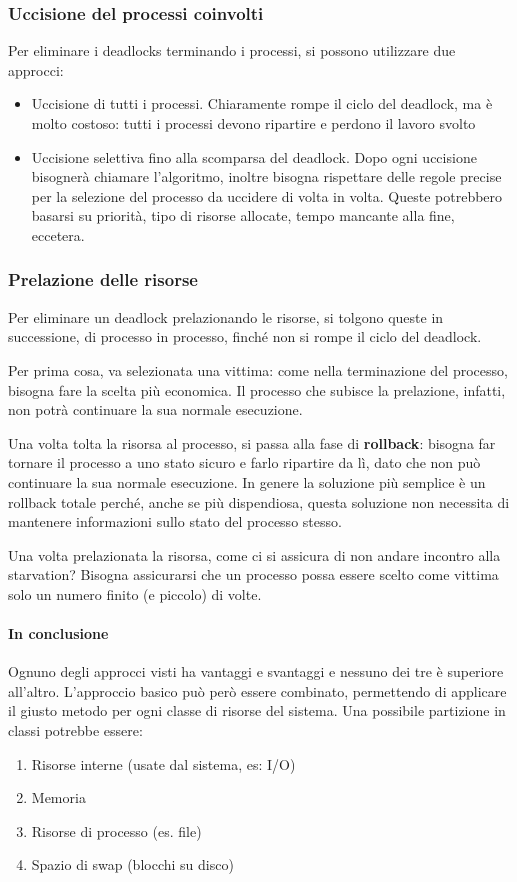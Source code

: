 \documentclass[a4]{article}
\begin{document}
\subsubsection{Uccisione del processi coinvolti}
Per eliminare i deadlocks terminando i processi, si possono utilizzare due approcci:
\begin{itemize}
    \item Uccisione di tutti i processi. Chiaramente rompe il ciclo del deadlock, ma è molto costoso: tutti i processi devono ripartire e perdono il lavoro svolto
    \item Uccisione selettiva fino alla scomparsa del deadlock. Dopo ogni uccisione bisognerà chiamare l'algoritmo, inoltre bisogna rispettare delle regole precise per la selezione del processo da uccidere di volta in volta. Queste potrebbero basarsi su priorità, tipo di risorse allocate, tempo mancante  alla fine, eccetera.
\end{itemize}

\subsubsection{Prelazione delle risorse}
Per eliminare un deadlock prelazionando le risorse, si tolgono queste in successione, di processo in processo, finché non si rompe il ciclo del deadlock.

Per prima cosa, va selezionata una vittima: come nella terminazione del processo, bisogna fare la scelta più economica. Il processo che subisce la prelazione, infatti, non potrà continuare la sua normale esecuzione.

Una volta tolta la risorsa al processo, si passa alla fase di \textbf{rollback}: bisogna far tornare il processo a uno stato sicuro e farlo ripartire da lì, dato che non può continuare la sua normale esecuzione. In genere la soluzione più semplice è un rollback totale perché, anche se più dispendiosa, questa soluzione non necessita di mantenere informazioni sullo stato del processo stesso.

Una volta prelazionata la risorsa, come ci si assicura di non andare incontro alla starvation? Bisogna assicurarsi che un processo possa essere scelto come vittima solo un numero finito (e piccolo) di volte.

\paragraph{In conclusione} Ognuno degli approcci visti ha vantaggi e svantaggi e nessuno dei tre è superiore all'altro. L'approccio basico può però essere combinato, permettendo di applicare il giusto metodo per ogni classe di risorse del sistema. Una possibile partizione in classi potrebbe essere:
\begin{enumerate}
    \item Risorse interne (usate dal sistema, es: I/O)
    \item Memoria
    \item Risorse di processo (es. file)
    \item Spazio di swap (blocchi su disco)
\end{enumerate}
\end{document}
